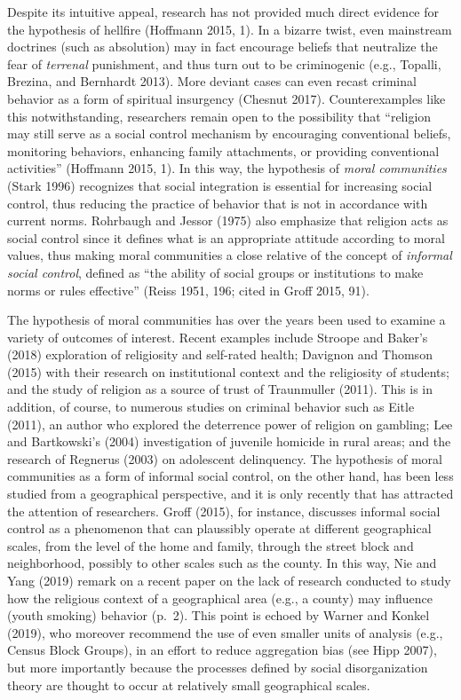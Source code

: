 \documentclass[smallextended]{svjour3}       %
\begin{document}
Despite its intuitive appeal, research has not provided much direct
evidence for the hypothesis of hellfire (Hoffmann 2015, 1). In a bizarre
twist, even mainstream doctrines (such as absolution) may in fact
encourage beliefs that neutralize the fear of \emph{terrenal}
punishment, and thus turn out to be criminogenic (e.g., Topalli,
Brezina, and Bernhardt 2013). More deviant cases can even recast
criminal behavior as a form of spiritual insurgency (Chesnut 2017).
Counterexamples like this notwithstanding, researchers remain open to
the possibility that ``religion may still serve as a social control
mechanism by encouraging conventional beliefs, monitoring behaviors,
enhancing family attachments, or providing conventional activities''
(Hoffmann 2015, 1). In this way, the hypothesis of \emph{moral
communities} (Stark 1996) recognizes that social integration is
essential for increasing social control, thus reducing the practice of
behavior that is not in accordance with current norms. Rohrbaugh and
Jessor (1975) also emphasize that religion acts as social control since
it defines what is an appropriate attitude according to moral values,
thus making moral communities a close relative of the concept of
\emph{informal social control}, defined as ``the ability of social
groups or institutions to make norms or rules effective'' (Reiss 1951,
196; cited in Groff 2015, 91).

The hypothesis of moral communities has over the years been used to
examine a variety of outcomes of interest. Recent examples include
Stroope and Baker's (2018) exploration of religiosity and self-rated
health; Davignon and Thomson (2015) with their research on institutional
context and the religiosity of students; and the study of religion as a
source of trust of Traunmuller (2011). This is in addition, of course,
to numerous studies on criminal behavior such as Eitle (2011), an author
who explored the deterrence power of religion on gambling; Lee and
Bartkowski's (2004) investigation of juvenile homicide in rural areas;
and the research of Regnerus (2003) on adolescent delinquency. The
hypothesis of moral communities as a form of informal social control, on
the other hand, has been less studied from a geographical perspective,
and it is only recently that has attracted the attention of researchers.
Groff (2015), for instance, discusses informal social control as a
phenomenon that can plaussibly operate at different geographical scales,
from the level of the home and family, through the street block and
neighborhood, possibly to other scales such as the county. In this way,
Nie and Yang (2019) remark on a recent paper on the lack of research
conducted to study how the religious context of a geographical area
(e.g., a county) may influence (youth smoking) behavior (p.~2). This
point is echoed by Warner and Konkel (2019), who moreover recommend the
use of even smaller units of analysis (e.g., Census Block Groups), in an
effort to reduce aggregation bias (see Hipp 2007), but more importantly
because the processes defined by social disorganization theory are
thought to occur at relatively small geographical scales.
\end{document}

